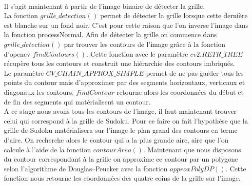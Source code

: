 \documentclass[12pt]{article}
\begin{document}
\\

\noindent
Il s'agit maintenant à partir de l'image binaire de détecter la grille.\\
 La fonction $grille\_detection()$ permet de détecter la grille lorsque cette dernière est blanche sur un fond noir. C'est pour cette raison que l'on inverse l'image dans la fonction processNormal. Afin de détecter la grille on commence dans $grille\_detection()$ par trouver les contours de l'image grâce à la fonction d'opencv $findContours()$. Cette fonction avec le paramètre $cv2.RETR\_TREE$ récupère tous les contours et construit une hiérarchie des contours imbriqués.\\
 Le paramètre $CV\_CHAIN\_APPROX\_SIMPLE$ permet de ne pas garder tous les points du contour mais d'approximer par des segments horizontaux, verticaux et diagonaux les contours. $findContour$ retourne alors les coordonnées du début et de fin des segments qui matérialisent un contour.\\
 
 \noindent
A ce stage nous avons tous les contours de l'image, il faut maintenant trouver celui qui correspond à la grille de Sudoku. Pour ce faire on fait l'hypothèse que la grille de Sudoku matérialisera sur l'image le plan grand des contours en terme d'aire. On recherche alors le contour qui a la plus grande aire, aire que l'on calcule à l'aide de la fonction $contourArea()$.
Maintenant que nous disposons du contour correspondant à la grille on approxime ce contour par un polygone selon l'algorithme de Douglas–Peucker avec la fonction $approxPolyDP()$. Cette fonction nous retourne les coordonnées des quatre coins de la grille sur l'image.\\
\end{document}

